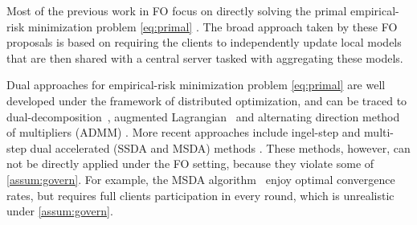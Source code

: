 
Most of the previous work in FO focus on directly solving the primal empirical-risk minimization problem \eqref{eq:primal}
\citep{mcmahan2017communication,li2018federated,yuan2021federated,karimireddy2020mime}. The broad approach taken by these FO proposals is based on requiring the clients to independently update local models that are then shared with a central server tasked with aggregating these models. 

Dual approaches for empirical-risk minimization problem \eqref{eq:primal} are well developed under the framework of distributed optimization, and can be traced to dual-decomposition~\citep{zeng2008fast,joachims1999making}, augmented Lagrangian~ \citep{jakovetic2014linear} and alternating direction method of multipliers (ADMM) \citep{boyd2011distributed,wei2012distributed}. More recent approaches include ingel-step and multi-step dual accelerated (SSDA and MSDA) methods \citep{Scaman2017OptimalAF}. These methods, however, can not be directly applied under the FO setting, because they violate some of \autoref{assum:govern}. For example, the MSDA algorithm~\citep{Scaman2017OptimalAF} enjoy optimal convergence rates, but requires full clients participation in every round, which is unrealistic under \autoref{assum:govern}. 

